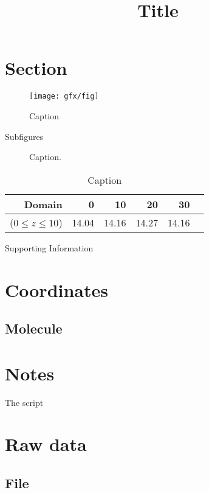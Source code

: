 \documentclass{article}
\title{Title}
\begin{document}
\maketitle

\section{Section}

\begin{figure}[H]
    \centering
    \texttt{[image: gfx/fig]}
    \caption{Caption}
    \label{fig:label}
\end{figure}


Subfigures 

\begin{figure}[H]%
    \centering
	\qquad
	\qquad
	\qquad
    \caption{Caption.}
    \label{fig:label}
\end{figure}


\begin{table}[H]
    \centering
    \begin{tabular}{rrrrrr}
	\hline
	Domain &  0 & 10 & 20 & 30 & \\
	\hline
	($ 0 \leq z \leq 10 $) & 14.04 & 14.16 & 14.27 & 14.16 \\
	\hline               
    \end{tabular}
    \caption{Caption}
    \label{tab:label}
\end{table}

\newpage

\centerline{\Huge Supporting Information}

\section{Coordinates}

\subsection{Molecule}


\section{Notes}

The script 



\section{Raw data}

\subsection{File}

\end{document}
